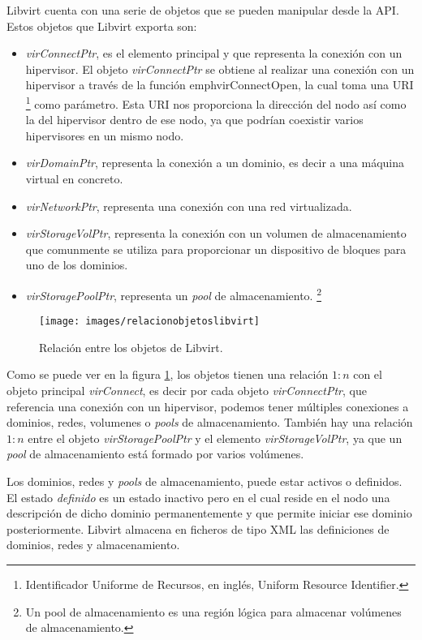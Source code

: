 \documentclass[spanisheDIVcalc,twoside,parskip-,pointlessnumbers,final]{scrbook}
\begin{document}
Libvirt cuenta con una serie de objetos que se pueden manipular desde
la API. Estos objetos que Libvirt exporta son:
\begin{itemize}
\item \emph{virConnectPtr}, es el elemento principal y que representa la
conexión con un hipervisor. El objeto \emph{virConnectPtr} se obtiene al
realizar una conexión con un hipervisor a través de la función emph{virConnectOpen},
la cual toma una URI%
\footnote{Identificador Uniforme de Recursos, en inglés, Uniform Resource Identifier.%
} como parámetro. Esta URI nos proporciona la dirección del nodo así
como la del hipervisor dentro de ese nodo, ya que podrían coexistir
varios hipervisores en un mismo nodo.
\item \emph{virDomainPtr}, representa la conexión a un dominio, es decir
a una máquina virtual en concreto.
\item \emph{virNetworkPtr}, representa una conexión con una red virtualizada.
\item \emph{virStorageVolPtr}, representa la conexión con un volumen de
almacenamiento que comunmente se utiliza para proporcionar un dispositivo
de bloques para uno de los dominios.
\item \emph{virStoragePoolPtr}, representa un \emph{pool} de almacenamiento.%
\footnote{Un pool de almacenamiento es una región lógica para almacenar volúmenes
de almacenamiento.%
}
\end{itemize}
\begin{figure}[htpb]
\begin{centering}
\texttt{[image: images/relacionobjetoslibvirt]}
\par\end{centering}

\caption{Relación entre los objetos de Libvirt.}
\label{Relaci=0000F3n entre los objetos de libvirt}
\end{figure}


Como se puede ver en la figura \ref{Relaci=0000F3n entre los objetos de libvirt},
los objetos tienen una relación $1:n$ con el objeto principal \emph{virConnect},
es decir por cada objeto \emph{virConnectPtr}, que referencia una
conexión con un hipervisor, podemos tener múltiples conexiones a dominios,
redes, volumenes o \emph{pools} de almacenamiento. También hay una
relación $1:n$ entre el objeto \emph{virStoragePoolPtr} y el elemento
\emph{virStorageVolPtr}, ya que un \emph{pool} de almacenamiento está
formado por varios volúmenes.

Los dominios, redes y \emph{pools} de almacenamiento, puede estar
activos o definidos. El estado \emph{definido} es un estado inactivo
pero en el cual reside en el nodo una descripción de dicho dominio
permanentemente y que permite iniciar ese dominio posteriormente.
Libvirt almacena en ficheros de tipo XML las definiciones de dominios,
redes y almacenamiento.
\end{document}
